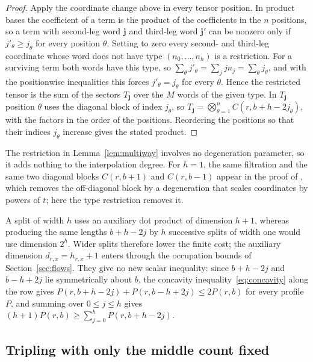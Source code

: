 \begin{proof}
Apply the coordinate change above in every tensor position. In
product bases the coefficient of a term is the product of the
coefficients in the \(n\) positions, so a term with second-leg word
\(\mathbf j\) and third-leg word \(\mathbf j'\) can be nonzero only if
\(j'_\theta\ge j_\theta\) for every position \(\theta\). Setting to zero every
second- and third-leg coordinate whose word does not have type
\((n_0,\ldots,n_h)\) is a restriction. For a surviving term both words have
this type, so
\(\sum_\theta j'_\theta=\sum_jjn_j=\sum_\theta j_\theta\), and with the
positionwise inequalities this forces \(j'_\theta=j_\theta\) for every
\(\theta\). Hence the restricted tensor is the sum of the sectors
\(T_{\mathbf j}\) over the \(M\) words of the given type. In
\(T_{\mathbf j}\) position \(\theta\) uses the diagonal block of index
\(j_\theta\), so
\(T_{\mathbf j}=\bigotimes_{\theta=1}^nC(r,b+h-2j_\theta)\), with the factors
in the order of the positions. Reordering the positions so that their
indices \(j_\theta\) increase gives the stated product.
\end{proof}

The restriction in Lemma~\ref{lem:multiway} involves no degeneration
parameter, so it adds nothing to the interpolation degree. For \(h=1\),
the same filtration and the same two diagonal blocks \(C(r,b+1)\) and
\(C(r,b-1)\) appear in the proof of \citet[Lemma~4.1]{OAI26}, which
removes the off-diagonal block by a degeneration that scales coordinates
by powers of \(t\); here the type restriction removes it.

\begin{remark}\label{rem:multiway-scalar}
A split of width \(h\) uses an auxiliary dot product of dimension
\(h+1\), whereas producing the same lengths \(b+h-2j\) by \(h\) successive
splits of width one would use dimension \(2^h\). Wider splits therefore
lower the finite cost; the auxiliary dimension \(d_{r,x}=h_{r,x}+1\) enters
through the occupation bounds of Section~\ref{sec:flows}. They give no new
scalar inequality: since \(b+h-2j\) and \(b-h+2j\) lie symmetrically about
\(b\), the concavity inequality~\eqref{eq:concavity} along the row gives
\(P(r,b+h-2j)+P(r,b-h+2j)\le2P(r,b)\) for every profile \(P\), and summing
over \(0\le j\le h\) gives \((h+1)P(r,b)\ge\sum_{j=0}^hP(r,b+h-2j)\).
\end{remark}

\subsection{Tripling with only the middle count fixed}
\label{subsec:tripling}

